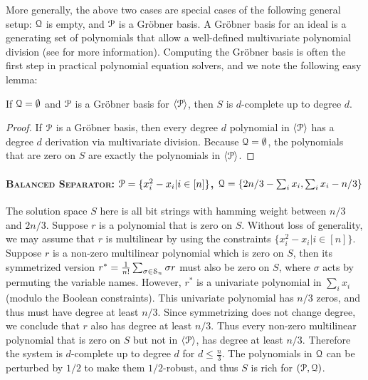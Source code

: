 \documentclass[a4paper,UKenglish]{lipics-v2016}
\begin{document}
\begin{remark}
	More generally, the above two cases are special cases of the following general setup: $\mathcal Q$ is empty, and $\mathcal P$ is a Gr\"obner basis. A Gr\"obner basis for an ideal is a generating set of polynomials that allow a well-defined multivariate polynomial division (see \cite{Grobner} for more information). Computing the Gr\"obner basis is often the first step in practical polynomial equation solvers, and we note the following easy lemma:
\begin{lemma}\label{lem:grobner}
If $\mathcal Q = \emptyset$ and $\mathcal P$ is a Gr\"obner basis for $\langle \mathcal P\rangle$, then $S$ is $d$-complete up to degree $d$. 
\end{lemma}
\begin{proof}
If $\mathcal P$ is a Gr\"obner basis, then every degree $d$ polynomial in $\langle \mathcal P\rangle$ has a degree $d$ derivation via multivariate division. Because $\mathcal Q = \emptyset$, the polynomials that are zero on $S$ are exactly the polynomials in $\langle \mathcal P\rangle$. 
\end{proof}

\end{remark}

\paragraph*{\textsc{Balanced Separator}: $\mathcal P = \{x_i^2 - x_i | i \in [n]\}$, $\mathcal Q = \{2n/3 - \sum_i x_i, \sum_i x_i - n/3\}$}
The solution space $S$ here is all bit strings with hamming weight between $n/3$ and $2n/3$. 
Suppose $r$ is a polynomial that is zero on $S$.  
Without loss of generality, we may assume that $r$ is multilinear by using the constraints $\{x_i^2 - x_i | i \in [n]\}$.
Suppose $r$ is a non-zero multilinear polynomial which is zero on $S$, then its symmetrized version $r^* = \frac{1}{n!}\sum_{\sigma \in \mathcal S_n} \sigma r$ must also be zero on $S$, where $\sigma$ acts by permuting the variable names. However, $r^*$ is a univariate polynomial in $\sum_i x_i$ (modulo the Boolean constraints). 
This univariate polynomial has $n/3$ zeros, and thus must have degree at least $n/3$. Since symmetrizing does not change degree, we conclude that $r$ also has degree at least $n/3$. Thus every non-zero multilinear polynomial that is zero on $S$ but not in $\langle \mathcal P\rangle$, has degree at least $n/3$. 
Therefore the system is $d$-complete up to degree $d$ for $d \leq \frac{n}{3}$.
The polynomials in $\mathcal Q$ can be perturbed by $1/2$ to make them $1/2$-robust, and thus $S$ is rich for $(\mathcal P, \mathcal Q)$. 
\end{document}
